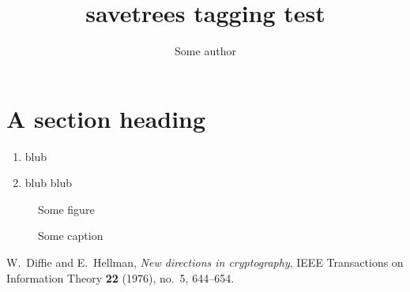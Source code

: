 \documentclass{article}
\title{savetrees tagging test}
\author{Some author}
\begin{document}
\maketitle

\section{A section heading}
\kant[1-3]
\begin{enumerate}
\item blub
\item blub blub
\end{enumerate}
\begin{figure}
Some figure
\caption{Some caption}
\end{figure}

\begin{thebibliography}{9}
W.~Diffie and E.~Hellman, \emph{New directions in cryptography}, IEEE
Transactions on Information Theory \textbf{22} (1976), no.~5, 644--654.
\end{thebibliography}
\end{document}
